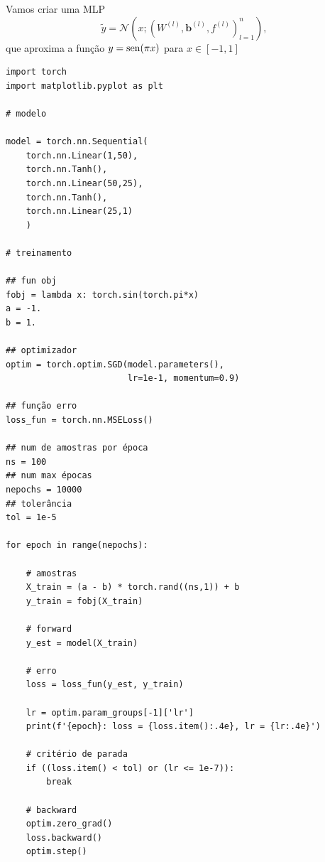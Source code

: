 \begin{ex}\label{cap_mlp_sec_autograd:ex:fun1d}
  Vamos criar uma MLP
  \begin{equation}
    \tilde{y} = \mathcal{N}\left(x; \left(W^{(l)}, \pmb{b}^{(l)}, f^{(l)}\right)_{l=1}^{n}\right),
  \end{equation}
  que aproxima a função $y = \operatorname{sen}(\pi x)$ para $x\in [-1, 1]$
  
\begin{lstlisting}[caption=autograd\_fun1d.py]
import torch
import matplotlib.pyplot as plt

# modelo

model = torch.nn.Sequential(
    torch.nn.Linear(1,50),
    torch.nn.Tanh(),
    torch.nn.Linear(50,25),
    torch.nn.Tanh(),
    torch.nn.Linear(25,1)
    )

# treinamento

## fun obj
fobj = lambda x: torch.sin(torch.pi*x)
a = -1.
b = 1.

## optimizador
optim = torch.optim.SGD(model.parameters(),
                        lr=1e-1, momentum=0.9)

## função erro
loss_fun = torch.nn.MSELoss()

## num de amostras por época
ns = 100
## num max épocas
nepochs = 10000
## tolerância
tol = 1e-5

for epoch in range(nepochs):

    # amostras
    X_train = (a - b) * torch.rand((ns,1)) + b
    y_train = fobj(X_train)
    
    # forward
    y_est = model(X_train)

    # erro
    loss = loss_fun(y_est, y_train)

    lr = optim.param_groups[-1]['lr']
    print(f'{epoch}: loss = {loss.item():.4e}, lr = {lr:.4e}')

    # critério de parada
    if ((loss.item() < tol) or (lr <= 1e-7)):
        break

    # backward
    optim.zero_grad()
    loss.backward()
    optim.step()
\end{lstlisting}


\end{ex}
